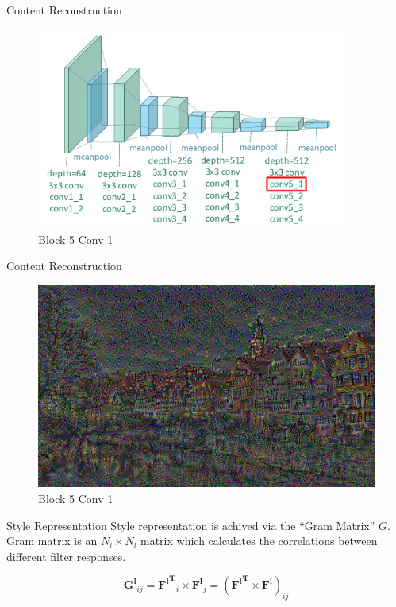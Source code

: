 \documentclass{beamer}
\begin{document}
\begin{frame}{Content Reconstruction}
\begin{figure}[ht]
\centering
\caption{Block 5 Conv 1}
\includegraphics[width=0.9\textwidth]{img/vgg19/content/block5_conv1}
\end{figure}
\end{frame}
\begin{frame}{Content Reconstruction}
\begin{figure}[ht]
\centering
\caption{Block 5 Conv 1}
\includegraphics[width=\textwidth]{img/content/block5_conv1.png}
\end{figure}
\end{frame}

\begin{frame}{Style Representation}
Style representation is achived via the ``Gram Matrix'' $G$. Gram matrix is
an $N_l \times N_l$ matrix which calculates the correlations between
different filter responses.

\begin{equation}
    \mathbf{G^l}_{ij} = \mathbf{{F^l}^T}_i \times \mathbf{F^l}_j
    = (\mathbf{{F^l}^T} \times \mathbf{F^l})_{ij}
\end{equation}
\end{frame}
\end{document}
